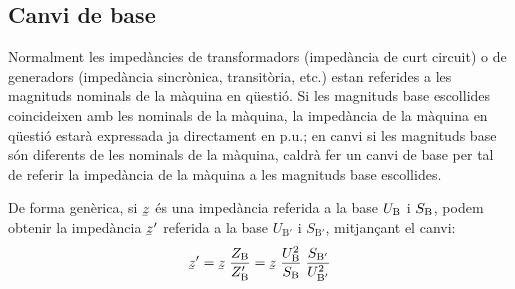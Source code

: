 \subsection{Canvi de base} 

Normalment les imped\`{a}ncies de transformadors (imped\`{a}ncia de curt circuit) o de generadors (imped\`{a}ncia sincr\`{o}nica, transit\`{o}ria, etc.) estan referides a les magnituds nominals de la m\`{a}quina en q\"{u}esti\'{o}. Si les magnituds base escollides coincideixen amb les nominals de la m\`{a}quina,
la imped\`{a}ncia de la m\`{a}quina en q\"{u}esti\'{o} estar\`{a} expressada ja directament en p.u.; en canvi si les magnituds base s\'{o}n diferents de les nominals de la m\`{a}quina, caldr\`{a} fer un canvi de base per tal de referir la imped\`{a}ncia de la m\`{a}quina a les magnituds base escollides.

De forma gen\`{e}rica, si $\cmplx{z}$ \'{e}s una imped\`{a}ncia referida a la base $U_\mathrm{B}$ i $S_\mathrm{B}$, podem obtenir la imped\`{a}ncia $\cmplx{z}'$ referida a la base $U_{\text{B}'}$ i $S_{\text{B}'}$, mitjan\c{c}ant el canvi:
\begin{equation}
   \cmplx{z}' = \cmplx{z} \; \frac{Z\ped{B}}{Z\ped{B}'} = \cmplx{z} \; \frac{U\ped{B}^2}{S\ped{B}} \; \frac{S_{\text{B}'}}{U_{\text{B}'}^2}
\end{equation}

